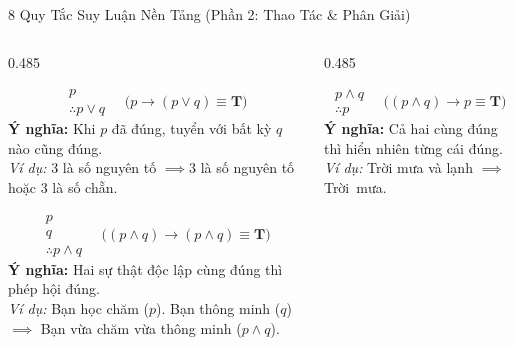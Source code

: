 \documentclass[aspectratio=169, 10pt]{beamer}
\begin{document}
\begin{frame}{8 Quy Tắc Suy Luận Nền Tảng (Phần 2: Thao Tác \& Phân Giải)}
  \begin{columns}[t, onlytextwidth]
    \begin{column}{0.485\textwidth}
      \begin{cozyDef}
        \scriptsize
        \vspace{-0.1cm}
        $$\begin{array}{l} p \\ \hline \therefore p \lor q \end{array} \quad \Big( p \to (p \lor q) \equiv \mathbf{T} \Big)$$
        \textbf{Ý nghĩa:} Khi $p$ đã đúng, tuyển với bất kỳ $q$ nào cũng đúng.\\[3pt]
        \textit{Ví dụ:} $3$ là số nguyên tố $\implies 3$ là số nguyên tố hoặc $3$ là số chẵn.
      \end{cozyDef}
      \vspace{0.08cm}
      \begin{cozyDef}
        \scriptsize
        \vspace{-0.1cm}
        $$\begin{array}{l} p \\ q \\ \hline \therefore p \land q \end{array} \quad \Big( (p \land q) \to (p \land q) \equiv \mathbf{T} \Big)$$
        \textbf{Ý nghĩa:} Hai sự thật độc lập cùng đúng thì phép hội đúng.\\[3pt]
        \textit{Ví dụ:} Bạn học chăm ($p$). Bạn thông minh ($q$) $\implies$ Bạn vừa chăm vừa thông minh ($p \land q$).
      \end{cozyDef}
    \end{column}
    \begin{column}{0.485\textwidth}
      \begin{cozyDef}
        \scriptsize
        \vspace{-0.1cm}
        $$\begin{array}{l} p \land q \\ \hline \therefore p \end{array} \quad \Big( (p \land q) \to p \equiv \mathbf{T} \Big)$$
        \textbf{Ý nghĩa:} Cả hai cùng đúng thì hiển nhiên từng cái đúng.\\[3pt]
        \textit{Ví dụ:} Trời mưa và lạnh $\implies$ Trời~mưa.
      \end{cozyDef}

\end{column}
\end{columns}
\end{frame}
\end{document}
